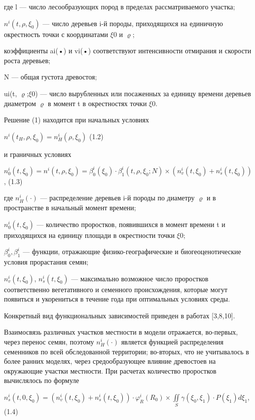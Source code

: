 \documentclass{report}
\begin{document}
где l — число лесообразующих пород в пределах рассматривае\-мого участка;

 $n^i\left(t,\rho ,\xi _0\right)$ — число деревьев i{}-й породы, приходящихся на еди\-ничную окрестность точки с
координатами ${\xi}$0 и ${\varrho}$;

коэффициенты ai(•) и vi(•) соответствуют интенсивности от\-мирания и скорости роста деревьев;

N — общая густота древостоя;

ui(t, ${\varrho}$;${\xi}$0) — число вырубленных или посаженных за единицу времени деревьев диаметром ${\varrho}$ в
момент t в окрестностях точки ${\xi}$0.

Решение (1) находится при начальных условиях

 $n^i\left(t_H,\rho ,\xi _0\right)=n_H^i\left(\rho ,\xi _0\right)$  (1.2)

и граничных условиях

 $n_0^i\left(t,\xi _0\right)=n^i\left(t,\rho ,\xi _0\right)=\beta _0^i\left(\xi _0\right)\cdot \beta _1^i\left(t,\rho
,\xi _0;N\right)\times \left(n_v^i\left(t,\xi _0\right)+n_s^i\left(t,\xi _0\right)\right)$ ,  (1.3)

где  $n_H^i(\cdot )$ — распределение деревьев i{}-й породы по диаметру ${\varrho}$ и в пространстве в начальный момент
времени;

  $n_0^i(t,\xi _0)$ — количество проростков, появившихся в момент времени t и приходящихся на единицу площади в
окрестности точки ${\xi}$0;

 $\beta _0^i,\beta _1^i$ — функции, отражающие физико-географические и биогеоценотические условия прорастания семян;

 $n_v^i(t,\xi _0)$,  $n_s^i(t,\xi _0)$ — максимально возможное число пророст\-ков соответственно вегетативного и
семенного происхождения, которые могут появиться и укорениться в течение года при опти\-мальных условиях среды.

Конкретный вид функциональных зависимостей приведен в работах [3,8,10].

Взаимосвязь различных участков местности в модели отража\-ется, во-первых, через перенос семян, поэтому  $n_H^i(\cdot )$
является функцией распределения семенников по всей обследованной тер\-ритории; во-вторых, что не учитывалось в более
ранних моделях, через средообразующее влияние древостоев на окружающие участки местности. При расчетах количество
проростков вычис\-лялось по формуле

 $n_s^i\left(t,0,\xi _0\right)=\left(n_v^i\left(t,\xi _0\right)+n_s^i\left(t,\xi _0\right)\right)\cdot \varphi
_R^i\left(R_0\right)\times \underset S{\iint }\gamma \left(\xi _0,\xi _1\right)\cdot P\left(\xi _1\right)\mathit{d\xi
}_1$,  (1.4)
\end{document}

